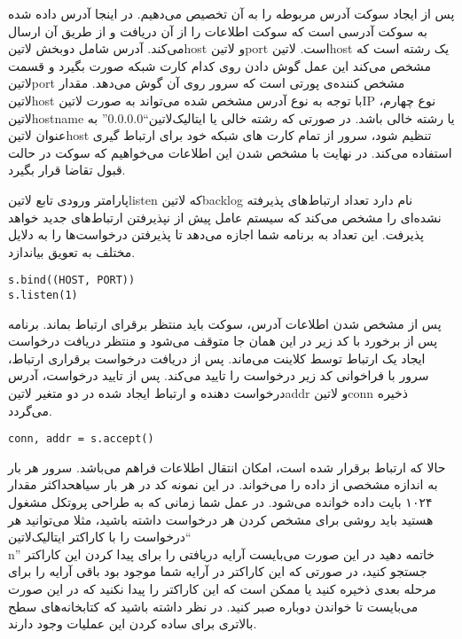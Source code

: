 \documentclass[]{article}
\begin{document}
  پس از ایجاد سوکت‌ آدرس مربوطه را به آن تخصیص می‌دهیم.
  در اینجا آدرس داده شده به سوکت‌ آدرسی‌ است که سوکت اطلاعات را از آن دریافت و از طریق آن ارسال می‌کند.
  آدرس شامل دوبخش ‌لاتین{host} و ‌لاتین{port} است.
  ‌لاتین{host} یک رشته است که مشخص می‌کند این عمل گوش دادن روی کدام کارت شبکه صورت بگیرد و قسمت ‌لاتین{port} مشخص کننده‌ی پورتی است که سرور روی آن گوش می‌دهد.
  مقدار ‌لاتین{host} با توجه به نوع آدرس مشخص شده می‌تواند به صورت ‌لاتین{IP} نوع چهارم،  ‌لاتین{hostname} یا رشته خالی باشد.
  در صورتی که رشته خالی یا ‌ایتالیک{‌لاتین{``0.0.0.0''}} به عنوان ‌لاتین{host} تنظیم شود،
  سرور از تمام کارت های شبکه خود برای ارتباط گیری استفاده می‌کند.
  در نهایت با مشخص شدن این اطلاعات می‌خواهیم که سوکت در حالت قبول تقاضا قرار بگیرد.

  پارامتر ورودی تابع ‌لاتین{listen} که ‌لاتین{backlog} نام دارد تعداد ارتباط‌های پذیرفته نشده‌ای را مشخص می‌کند که سیستم عامل
  پیش از نپذیرفتن ارتباط‌های جدید خواهد پذیرفت. این تعداد به برنامه شما اجازه می‌دهد تا پذیرفتن درخواست‌ها را به دلایل مختلف به تعویق بیاندازد.

  \begin{latin}
  \begin{verbatim}
s.bind((HOST, PORT))
s.listen(1)
  \end{verbatim}
  \end{latin}

  پس از مشخص شدن اطلاعات آدرس، سوکت باید منتظر برقرای ارتباط بماند.
  برنامه پس از برخورد با کد زیر در این همان جا متوقف می‌شود و منتظر دریافت درخواست ایجاد یک ارتباط توسط کلاینت می‌ماند.
  پس از دریافت درخواست برقراری ارتباط، سرور با فراخوانی کد زیر درخواست را تایید می‌کند.
  پس از تایید درخواست، آدرس درخواست دهنده و ارتباط ایجاد شده در دو متغیر ‌لاتین{addr} و ‌لاتین{conn} ذخیره می‌گردد.

  \begin{latin}
  \begin{verbatim}
conn, addr = s.accept()
  \end{verbatim}
  \end{latin}

  حالا که ارتباط برقرار شده است، امکان انتقال اطلاعات فراهم می‌باشد.
  سرور هر بار به اندازه مشخصی از داده را می‌خواند. در این نمونه کد در هر بار ‌سیاه{حداکثر} مقدار ۱۰۲۴ بایت داده خوانده می‌شود.
  در عمل شما زمانی که به طراحی پروتکل مشغول هستید باید روشی برای مشخص کردن هر درخواست داشته باشید، مثلا می‌توانید هر درخواست
  را با کاراکتر ‌ایتالیک{‌لاتین{``\\n''}} خاتمه دهید در این صورت می‌بایست آرایه دریافتی را برای پیدا کردن این کاراکتر جستجو کنید،
  در صورتی که این کاراکتر در آرایه شما موجود بود باقی آرایه را برای مرحله بعدی ذخیره کنید یا ممکن است که این کاراکتر را پیدا نکنید که
  در این صورت می‌بایست تا خواندن دوباره صبر کنید. در نظر داشته باشید که کتابخانه‌های سطح بالاتری برای ساده کردن این عملیات وجود دارند.
\end{document}
